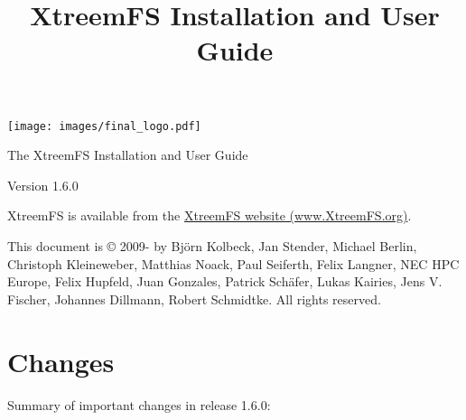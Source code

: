 \documentclass[a4paper,10pt]{book}
\title{XtreemFS Installation and User Guide}
\begin{document}
\begin{titlepage}
\begin{flushright}
 \texttt{[image: images/final\_logo.pdf]}
\end{flushright}

\vspace{3cm}

\begin{flushleft}
\sffamily \begin{LARGE}The XtreemFS Installation and User Guide\end{LARGE}

Version 1.6.0
\end{flushleft}


\end{titlepage}
\garamond
XtreemFS is available from the \href{http://www.XtreemFS.org}{XtreemFS website (www.XtreemFS.org)}.


This document is \copyright{} 2009-\the\year{} by Bj\"orn Kolbeck, Jan Stender, Michael Berlin, Christoph Kleineweber, Matthias Noack, Paul Seiferth, Felix Langner, NEC HPC Europe, Felix Hupfeld, Juan Gonzales, Patrick Sch\"afer, Lukas Kairies, Jens V. Fischer, Johannes Dillmann, Robert Schmidtke. All rights reserved.

\setcounter{tocdepth}{2}
\tableofcontents

\chapter*{Changes}

Summary of important changes in release 1.6.0:
\end{document}
